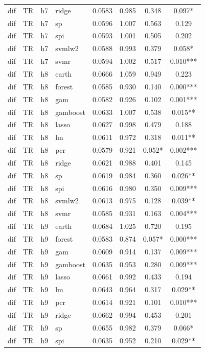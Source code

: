 \begin{ThreePartTable}
\begin{longtable}[t]{llclcccc}
dif & TR & h7 & ridge & 0.0583 & 0.985 & 0.348 & 0.097*\\
dif & TR & h7 & sp & 0.0596 & 1.007 & 0.563 & 0.129\\
dif & TR & h7 & spi & 0.0593 & 1.001 & 0.505 & 0.202\\
dif & TR & h7 & svmlw2 & 0.0588 & 0.993 & 0.379 & 0.058*\\
dif & TR & h7 & svmr & 0.0594 & 1.002 & 0.517 & 0.010***\\
\addlinespace
dif & TR & h8 & earth & 0.0666 & 1.059 & 0.949 & 0.223\\
dif & TR & h8 & forest & 0.0585 & 0.930 & 0.140 & 0.000***\\
dif & TR & h8 & gam & 0.0582 & 0.926 & 0.102 & 0.001***\\
dif & TR & h8 & gamboost & 0.0633 & 1.007 & 0.538 & 0.015**\\
dif & TR & h8 & lasso & 0.0627 & 0.998 & 0.479 & 0.188\\
dif & TR & h8 & lm & 0.0611 & 0.972 & 0.318 & 0.011**\\
dif & TR & h8 & pcr & 0.0579 & 0.921 & 0.052* & 0.002***\\
dif & TR & h8 & ridge & 0.0621 & 0.988 & 0.401 & 0.145\\
dif & TR & h8 & sp & 0.0619 & 0.984 & 0.360 & 0.026**\\
dif & TR & h8 & spi & 0.0616 & 0.980 & 0.350 & 0.009***\\
dif & TR & h8 & svmlw2 & 0.0613 & 0.975 & 0.128 & 0.039**\\
dif & TR & h8 & svmr & 0.0585 & 0.931 & 0.163 & 0.004***\\
\addlinespace
dif & TR & h9 & earth & 0.0684 & 1.025 & 0.720 & 0.195\\
dif & TR & h9 & forest & 0.0583 & 0.874 & 0.057* & 0.000***\\
dif & TR & h9 & gam & 0.0609 & 0.914 & 0.137 & 0.009***\\
dif & TR & h9 & gamboost & 0.0635 & 0.953 & 0.280 & 0.009***\\
dif & TR & h9 & lasso & 0.0661 & 0.992 & 0.433 & 0.194\\
dif & TR & h9 & lm & 0.0643 & 0.964 & 0.317 & 0.029**\\
dif & TR & h9 & pcr & 0.0614 & 0.921 & 0.101 & 0.010***\\
dif & TR & h9 & ridge & 0.0662 & 0.994 & 0.453 & 0.201\\
dif & TR & h9 & sp & 0.0655 & 0.982 & 0.379 & 0.066*\\
dif & TR & h9 & spi & 0.0635 & 0.952 & 0.210 & 0.029**\\

\end{longtable}
\end{ThreePartTable}
